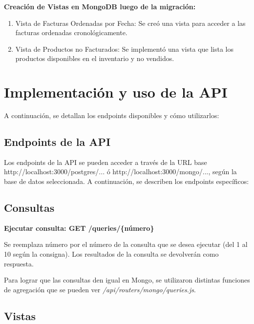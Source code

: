\documentclass[a4paper,12pt]{article}
\begin{document}
	\textbf{Creación de Vistas en MongoDB luego de la migración:}
	
		\begin{enumerate}
			
		\item Vista de Facturas Ordenadas por Fecha: Se creó una vista para acceder a las facturas ordenadas cronológicamente.
		
		\item Vista de Productos no Facturados: Se implementó una vista que lista los productos disponibles en el inventario y no vendidos.
		
		\end{enumerate}
	
	\newpage
	
	
	
	\section{Implementación y uso de la API}
	
	A continuación, se detallan los endpoints disponibles y cómo utilizarlos:
	
	\subsection{Endpoints de la API}
	
	Los endpoints de la API se pueden acceder a través de la URL base http://localhost:3000/postgres/... ó http://localhost:3000/mongo/..., según la base de datos seleccionada. A continuación, se describen los endpoints específicos:
	
	\subsection{Consultas}
	
	\textbf{Ejecutar consulta: GET /queries/\{número\}}
	
	\bigskip
	
	Se reemplaza {número} por el número de la consulta que se desea ejecutar (del 1 al 10 según la consigna). Los resultados de la consulta se devolverán como respuesta.
	
	\bigskip
	
	Para lograr que las consultas den igual en Mongo, se utilizaron distintas funciones de agregación que se pueden ver \textit{/api/routers/mongo/queries.js}.
	
	\subsection{Vistas}
	
\end{document}
